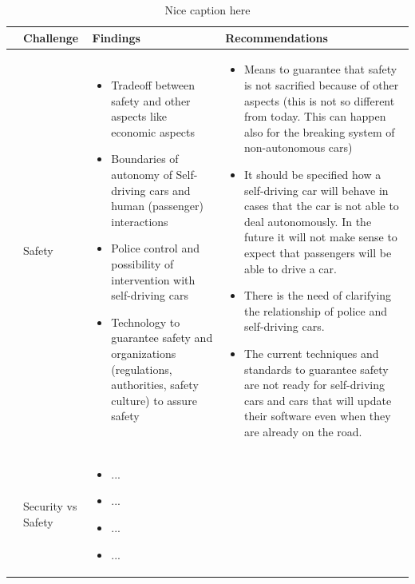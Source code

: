 \begin{table}
	\centering
	\caption{Nice caption here}
	\label{tab:Findings}
	\begin{small}
		\begin{supertabular}{>{}p{.02\textwidth}|>{\raggedright}p{.105\textwidth}>{\raggedright}p{.4\textwidth}>{\raggedright}p{.4\textwidth}}
			\toprule
			 & {Challenge} & {Findings} & {Recommendations}  \tabularnewline
			\midrule
			 &Safety & 
					\begin{itemize}
					\item Tradeoff between safety and other aspects like economic aspects
					\item Boundaries of autonomy of Self-driving cars and human (passenger) interactions
					\item Police control and possibility of intervention with self-driving cars
					\item Technology to guarantee safety and organizations (regulations, authorities, safety culture) to assure safety
					\end{itemize}
 			& 
					\begin{itemize}
					\item Means to guarantee that safety is not sacrified because of other aspects (this is not so different from today. This can happen also for the breaking system of non-autonomous cars)
					\item It should be specified how a self-driving car will behave in cases that the car is not able to deal autonomously. In the future it will not make sense to expect that passengers will be able to drive a car. 
					\item There is the need of clarifying the relationship of police and self-driving cars.
					\item The current techniques and standards to guarantee safety are not ready for self-driving cars and cars that will update their software even when they are already on the road.
					\end{itemize} 			
 			 \tabularnewline {}
			& Security vs Safety & 
					\begin{itemize}
					\item ...
					\item ...
					\item ...
					\item ...

\end{itemize}
\end{supertabular}
\end{small}
\end{table}
